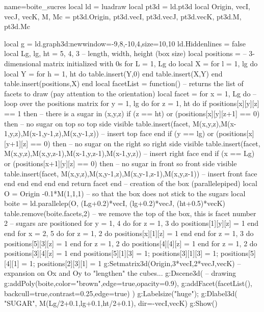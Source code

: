 \begin{luadraw}{name=boite_sucres}
local ld = luadraw
local pt3d = ld.pt3d
local Origin, vecI, vecJ, vecK, M, Mc = pt3d.Origin, pt3d.vecI, pt3d.vecJ, pt3d.vecK, pt3d.M, pt3d.Mc

local g = ld.graph3d:new{window={-9,8,-10,4},size={10,10}}
ld.Hiddenlines = false
local Lg, lg, ht = 5, 4, 3 -- length, width, height (box size)
local positions = {} -- 3-dimensional matrix initialized with 0s
for L = 1, Lg do
    local X = {}
    for l = 1, lg do
        local Y = {}
        for h = 1, ht do table.insert(Y,0) end
        table.insert(X,Y)
    end
    table.insert(positions,X)
end
local facetList = function() -- returns the list of facets to draw (pay attention to the orientation)
    local facet = {}
    for x = 1, Lg do -- loop over the positions matrix
        for y = 1, lg do
            for z = 1, ht do
                if positions[x][y][z] == 1 then -- there is a sugar in (x,y,z)
                    if (z == ht) or (positions[x][y][z+1] == 0) then -- no sugar on top so top side visible
                        table.insert(facet, {M(x,y,z),M(x-1,y,z),M(x-1,y-1,z),M(x,y-1,z)}) -- insert top face
                    end
                    if (y == lg) or (positions[x][y+1][z] == 0) then -- no sugar on the right so right side visible
                        table.insert(facet, {M(x,y,z),M(x,y,z-1),M(x-1,y,z-1),M(x-1,y,z)}) -- insert right face
                    end
                    if (x == Lg) or (positions[x+1][y][z] == 0) then -- no sugar in front so front side visible
                        table.insert(facet, {M(x,y,z),M(x,y-1,z),M(x,y-1,z-1),M(x,y,z-1)}) -- insert front face
                    end
                end
            end
        end
    end
    return facet
end
-- creation of the box (parallelepiped)
local O = Origin -0.1*M(1,1,1) -- so that the box does not stick to the sugars
local boite = ld.parallelep(O, (Lg+0.2)*vecI, (lg+0.2)*vecJ, (ht+0.5)*vecK)
table.remove(boite.facets,2) -- we remove the top of the box, this is facet number 2
-- sugars are positioned
for y = 1, 4 do for z = 1, 3 do  positions[1][y][z] = 1 end end
for x = 2, 5 do for z = 1, 2 do positions[x][1][z] = 1 end end
for z = 1, 3 do positions[5][3][z] = 1 end
for z = 1, 2 do positions[4][4][z] = 1 end
for z = 1, 2 do positions[3][4][z] = 1 end
positions[5][1][3] = 1; positions[3][1][3] = 1; positions[5][4][1] = 1; positions[2][3][1] = 1
g:Setmatrix3d({Origin,3*vecI,2*vecJ,vecK}) -- expansion on Ox and Oy to "lengthen" the cubes...
g:Dscene3d( -- drawing
    g:addPoly(boite,{color="brown",edge=true,opacity=0.9}),
    g:addFacet(facetList(), {backcull=true,contrast=0.25,edge=true})    )
g:Labelsize("huge"); g:Dlabel3d( "SUGAR", M(Lg/2+0.1,lg+0.1,ht/2+0.1), {dir={-vecI,vecK}})
g:Show()
\end{luadraw}
